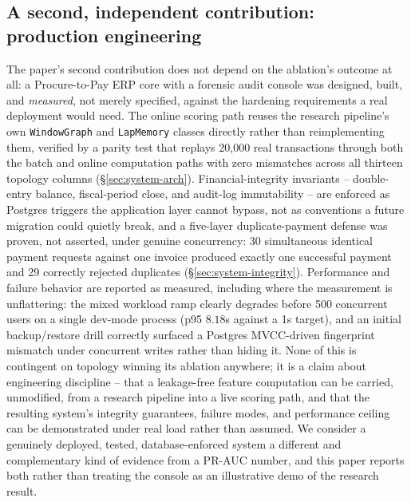 \subsection{A second, independent contribution: production engineering}
The paper's second contribution does not depend on the ablation's outcome at
all: a Procure-to-Pay ERP core with a forensic audit console was designed,
built, and \emph{measured}, not merely specified, against the hardening
requirements a real deployment would need. The online scoring path reuses
the research pipeline's own \texttt{WindowGraph} and \texttt{LapMemory}
classes directly rather than reimplementing them, verified by a parity test
that replays 20{,}000 real transactions through both the batch and online
computation paths with zero mismatches across all thirteen topology columns
(\S\ref{sec:system-arch}). Financial-integrity invariants -- double-entry
balance, fiscal-period close, and audit-log immutability -- are enforced as
Postgres triggers the application layer cannot bypass, not as conventions a
future migration could quietly break, and a five-layer duplicate-payment
defense was proven, not asserted, under genuine concurrency: 30 simultaneous
identical payment requests against one invoice produced exactly one
successful payment and 29 correctly rejected duplicates
(\S\ref{sec:system-integrity}). Performance and failure behavior are reported
as measured, including where the measurement is unflattering: the mixed
workload ramp clearly degrades before 500 concurrent users on a single
dev-mode process (p95 $8.18$s against a 1s target), and an initial
backup/restore drill correctly surfaced a Postgres MVCC-driven fingerprint
mismatch under concurrent writes rather than hiding it. None of this is
contingent on topology winning its ablation anywhere; it is a claim about
engineering discipline -- that a leakage-free feature computation can be
carried, unmodified, from a research pipeline into a live scoring path, and
that the resulting system's integrity guarantees, failure modes, and
performance ceiling can be demonstrated under real load rather than assumed.
We consider a genuinely deployed, tested, database-enforced system a
different and complementary kind of evidence from a PR-AUC number, and this
paper reports both rather than treating the console as an illustrative demo
of the research result.

